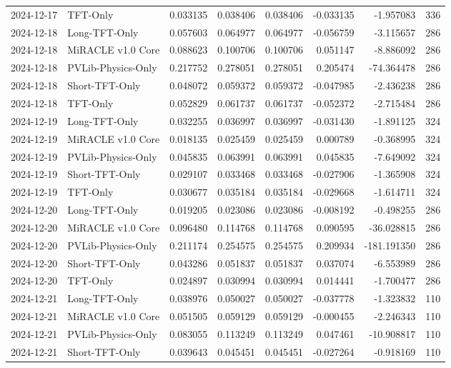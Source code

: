 \begin{tabular}{llrrrrrr}
2024-12-17 & TFT-Only & 0.033135 & 0.038406 & 0.038406 & -0.033135 & -1.957083 & 336 \\
2024-12-18 & Long-TFT-Only & 0.057603 & 0.064977 & 0.064977 & -0.056759 & -3.115657 & 286 \\
2024-12-18 & MiRACLE v1.0 Core & 0.088623 & 0.100706 & 0.100706 & 0.051147 & -8.886092 & 286 \\
2024-12-18 & PVLib-Physics-Only & 0.217752 & 0.278051 & 0.278051 & 0.205474 & -74.364478 & 286 \\
2024-12-18 & Short-TFT-Only & 0.048072 & 0.059372 & 0.059372 & -0.047985 & -2.436238 & 286 \\
2024-12-18 & TFT-Only & 0.052829 & 0.061737 & 0.061737 & -0.052372 & -2.715484 & 286 \\
2024-12-19 & Long-TFT-Only & 0.032255 & 0.036997 & 0.036997 & -0.031430 & -1.891125 & 324 \\
2024-12-19 & MiRACLE v1.0 Core & 0.018135 & 0.025459 & 0.025459 & 0.000789 & -0.368995 & 324 \\
2024-12-19 & PVLib-Physics-Only & 0.045835 & 0.063991 & 0.063991 & 0.045835 & -7.649092 & 324 \\
2024-12-19 & Short-TFT-Only & 0.029107 & 0.033468 & 0.033468 & -0.027906 & -1.365908 & 324 \\
2024-12-19 & TFT-Only & 0.030677 & 0.035184 & 0.035184 & -0.029668 & -1.614711 & 324 \\
2024-12-20 & Long-TFT-Only & 0.019205 & 0.023086 & 0.023086 & -0.008192 & -0.498255 & 286 \\
2024-12-20 & MiRACLE v1.0 Core & 0.096480 & 0.114768 & 0.114768 & 0.090595 & -36.028815 & 286 \\
2024-12-20 & PVLib-Physics-Only & 0.211174 & 0.254575 & 0.254575 & 0.209934 & -181.191350 & 286 \\
2024-12-20 & Short-TFT-Only & 0.043286 & 0.051837 & 0.051837 & 0.037074 & -6.553989 & 286 \\
2024-12-20 & TFT-Only & 0.024897 & 0.030994 & 0.030994 & 0.014441 & -1.700477 & 286 \\
2024-12-21 & Long-TFT-Only & 0.038976 & 0.050027 & 0.050027 & -0.037778 & -1.323832 & 110 \\
2024-12-21 & MiRACLE v1.0 Core & 0.051505 & 0.059129 & 0.059129 & -0.000455 & -2.246343 & 110 \\
2024-12-21 & PVLib-Physics-Only & 0.083055 & 0.113249 & 0.113249 & 0.047461 & -10.908817 & 110 \\
2024-12-21 & Short-TFT-Only & 0.039643 & 0.045451 & 0.045451 & -0.027264 & -0.918169 & 110 \\

\end{tabular}
